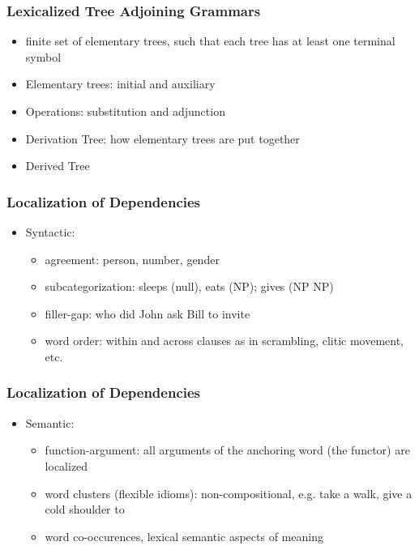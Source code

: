 \documentclass[compress,color=usenames]{beamer}
\begin{document}
\begin{frame}
\frametitle{Lexicalized Tree Adjoining Grammars}

\begin{itemize}

\item finite set of elementary trees, such that each tree has at least one
terminal symbol

\item Elementary trees: initial and auxiliary

\item Operations: substitution and adjunction

\item Derivation Tree: how elementary trees are put together

\item Derived Tree
\end{itemize}

\end{frame}

\begin{frame}
\frametitle{Localization of Dependencies}

\begin{itemize}

\item Syntactic:

\begin{itemize}
\item agreement: person, number, gender


\item subcategorization: sleeps (null), eats (NP); gives (NP NP)


\item filler-gap: who did John ask Bill to invite


\item word order: within and across clauses as in scrambling, clitic
movement, etc.
\end{itemize}

\end{itemize}
\end{frame}

\begin{frame}
\frametitle{Localization of Dependencies}

\begin{itemize}

\item Semantic:

\begin{itemize}
\item function-argument: all arguments of the anchoring word (the functor)
are localized


\item word clusters (flexible idioms): non-compositional, e.g. take a walk,
give a cold shoulder to


\item word co-occurences, lexical semantic aspects of meaning
\end{itemize}
\end{itemize}
\end{frame}
\end{document}
